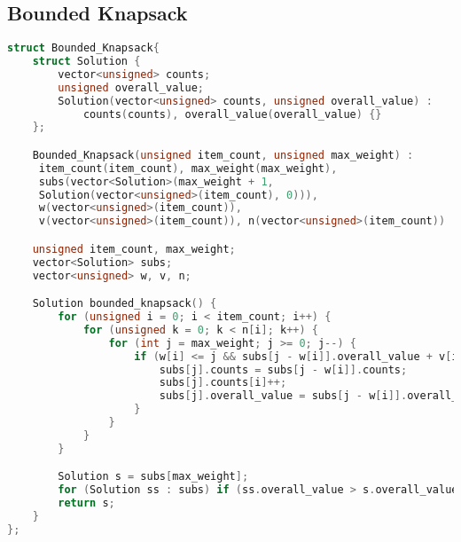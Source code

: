 \subsection{Bounded Knapsack}
\begin{lstlisting}[language=C++]
struct Bounded_Knapsack{
	struct Solution {
		vector<unsigned> counts;
		unsigned overall_value;
		Solution(vector<unsigned> counts, unsigned overall_value) :
			counts(counts), overall_value(overall_value) {}
	};

	Bounded_Knapsack(unsigned item_count, unsigned max_weight) :
	 item_count(item_count), max_weight(max_weight),
	 subs(vector<Solution>(max_weight + 1,
	 Solution(vector<unsigned>(item_count), 0))), 
	 w(vector<unsigned>(item_count)),
	 v(vector<unsigned>(item_count)), n(vector<unsigned>(item_count)) 	{}

	unsigned item_count, max_weight;
	vector<Solution> subs;
	vector<unsigned> w, v, n;

	Solution bounded_knapsack() {
		for (unsigned i = 0; i < item_count; i++) {
			for (unsigned k = 0; k < n[i]; k++) {
				for (int j = max_weight; j >= 0; j--) {
					if (w[i] <= j && subs[j - w[i]].overall_value + v[i] > subs[j].overall_value) {
						subs[j].counts = subs[j - w[i]].counts;
						subs[j].counts[i]++;
						subs[j].overall_value = subs[j - w[i]].overall_value + v[i];
					}
				}
			}
		}

		Solution s = subs[max_weight];
		for (Solution ss : subs) if (ss.overall_value > s.overall_value) s = ss;
		return s;
	}
};
\end{lstlisting}